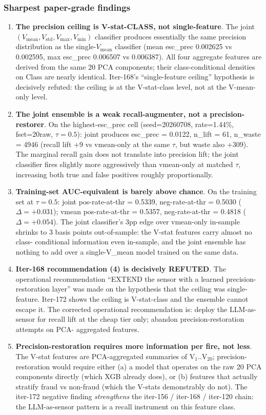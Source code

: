 \documentclass{article}
\begin{document}
\subsubsection{Sharpest paper-grade findings}
\begin{enumerate}
\item \textbf{The precision ceiling is V-stat-CLASS, not single-feature}.
The joint $(V_\mathrm{mean}, V_\mathrm{std}, V_\mathrm{max}, V_\mathrm{min})$
classifier produces essentially the same precision distribution as the
single-$V_\mathrm{mean}$ classifier (mean esc\_prec 0.002625 vs
0.002595, max esc\_prec 0.006507 vs 0.006387). All four aggregate
features are derived from the same 20 PCA components; their
class-conditional densities on Class are nearly identical. Iter-168's
``single-feature ceiling'' hypothesis is decisively refuted: the
ceiling is at the V-stat-class level, not at the V-mean-only level.
\item \textbf{The joint ensemble is a weak recall-augmenter, not a
precision-restorer}. On the highest-esc\_prec cell (seed=20260708,
rate=1.44\%, fset=20raw, $\tau = 0.5$): joint produces
esc\_prec = 0.0122, n\_lift = 61, n\_waste = 4946 (recall lift +9 vs
vmean-only at the same $\tau$, but waste also +309). The marginal
recall gain does not translate into precision lift; the joint
classifier fires slightly more aggressively than vmean-only at matched
$\tau$, increasing both true and false positives roughly proportionally.
\item \textbf{Training-set AUC-equivalent is barely above chance}.
On the training set at $\tau = 0.5$: joint pos-rate-at-thr = 0.5339,
neg-rate-at-thr = 0.5030 ($\Delta = +0.031$); vmean pos-rate-at-thr =
0.5357, neg-rate-at-thr = 0.4818 ($\Delta = +0.054$). The joint
classifier's 3pp edge over vmean-only in-sample shrinks to 3 basis
points out-of-sample: the V-stat features carry almost no class-
conditional information even in-sample, and the joint ensemble has
nothing to add over a single-V\_mean model trained on the same data.
\item \textbf{Iter-168 recommendation (4) is decisively REFUTED}. The
operational recommendation ``EXTEND the sensor with a learned
precision-restoration layer'' was made on the hypothesis that the
ceiling was single-feature. Iter-172 shows the ceiling is V-stat-class
and the ensemble cannot escape it. The corrected operational
recommendation is: deploy the LLM-as-sensor for recall lift at the
cheap tier only; abandon precision-restoration attempts on PCA-
aggregated features.
\item \textbf{Precision-restoration requires more information per
fire, not less}. The V-stat features are PCA-aggregated summaries of
V$_1$..V$_{20}$; precision-restoration would require either (a) a model
that operates on the raw 20 PCA components directly (which XGB already
does), or (b) features that actually stratify fraud vs non-fraud (which
the V-stats demonstrably do not). The iter-172 negative finding
\emph{strengthens} the iter-156 / iter-168 / iter-120 chain: the
LLM-as-sensor pattern is a recall instrument on this feature class.
\end{enumerate}
\end{document}
